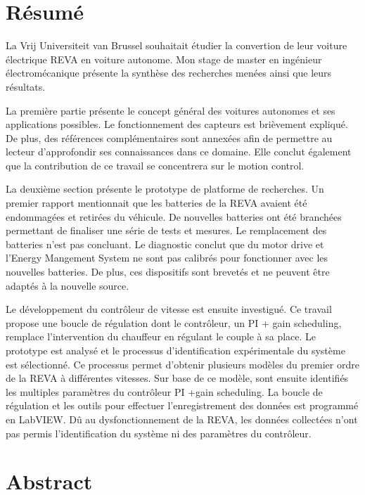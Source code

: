 \chapter*{Résumé}%
%
La Vrij Universiteit van Brussel souhaitait étudier la convertion de leur voiture électrique REVA en voiture autonome. Mon stage de master en ingénieur électromécanique présente la synthèse des recherches menées ainsi que leurs résultats.

La première partie présente le concept général des voitures autonomes et ses applications possibles. Le fonctionnement des capteurs est brièvement expliqué. De plus, des références complémentaires sont annexées afin de permettre au lecteur d’approfondir ses connaissances dans ce domaine. Elle conclut également que la contribution de ce travail se concentrera sur le motion control.  

La deuxième section présente le prototype de platforme de recherches. Un premier rapport mentionnait que les batteries de la REVA avaient été endommagées et retirées du véhicule. De nouvelles batteries ont été branchées permettant de finaliser une série de tests et mesures. Le remplacement des batteries n’est pas concluant. Le diagnostic conclut que du motor drive et l’Energy Mangement System ne sont pas calibrés pour fonctionner avec les nouvelles batteries. De plus, ces dispositifs sont brevetés et ne peuvent être adaptés à la nouvelle source. 

 Le développement du contrôleur de vitesse est ensuite investigué. Ce travail propose une boucle de régulation dont le contrôleur, un PI + gain scheduling, remplace l’intervention du chauffeur en régulant le couple à sa place. Le prototype est analysé et le processus d’identification expérimentale du système est sélectionné. Ce processus permet d’obtenir plusieurs modèles du premier ordre de la REVA à différentes vitesses. Sur base de ce modèle, sont ensuite identifiés les multiples paramètres du contrôleur PI +gain scheduling. La boucle de régulation et les outils pour effectuer l’enregistrement des données est programmé en LabVIEW. Dû au dysfonctionnement de la REVA, les données collectées n’ont pas permis l’identification du système ni des paramètres du contrôleur. 

\chapter*{Abstract}%
%

